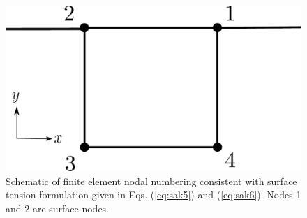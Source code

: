 \documentclass[final,authoryear,3p,times]{elsarticle}
\begin{document}
\begin{figure} \begin{center}
\includegraphics[scale=0.3]{pics/element.pdf}
\caption{Schematic of finite element nodal numbering consistent with surface tension formulation given in Eqs. (\ref{eq:sak5}) and (\ref{eq:sak6}).  Nodes 1 and 2 are surface nodes.}
\label{element} \end{center}
\end{figure}
\end{document}
